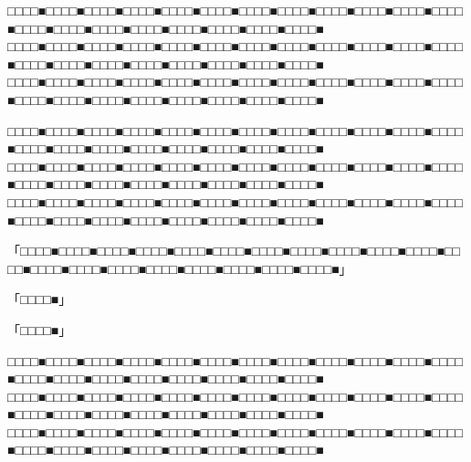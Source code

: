 \documentclass[
tate,
book,
openany,
paper={202mm,270mm},
oneside,
fontsize=9pt, %
jafontsize=9pt, %
head_space=11truemm, %
gutter=8truemm, %
line_length=78zw, %
number_of_lines=35, %
column_gap=5truemm,%
headfoot_verticalposition=4truemm,%
draft
]{jlreq}
\begin{document}
\begin{multicols*}{3}
□□□□■□□□□■□□□□■□□□□■□□□□■□□□□■□□□□■□□□□■□□□□■□□□□■□□□□■□□□□■□□□□■□□□□■□□□□■□□□□■□□□□■□□□□■□□□□■□□□□■
□□□□■□□□□■□□□□■□□□□■□□□□■□□□□■□□□□■□□□□■□□□□■□□□□■□□□□■□□□□■□□□□■□□□□■□□□□■□□□□■□□□□■□□□□■□□□□■□□□□■
□□□□■□□□□■□□□□■□□□□■□□□□■□□□□■□□□□■□□□□■□□□□■□□□□■□□□□■□□□□■□□□□■□□□□■□□□□■□□□□■□□□□■□□□□■□□□□■□□□□■

□□□□■□□□□■□□□□■□□□□■□□□□■□□□□■□□□□■□□□□■□□□□■□□□□■□□□□■□□□□■□□□□■□□□□■□□□□■□□□□■□□□□■□□□□■□□□□■□□□□■
□□□□■□□□□■□□□□■□□□□■□□□□■□□□□■□□□□■□□□□■□□□□■□□□□■□□□□■□□□□■□□□□■□□□□■□□□□■□□□□■□□□□■□□□□■□□□□■□□□□■
□□□□■□□□□■□□□□■□□□□■□□□□■□□□□■□□□□■□□□□■□□□□■□□□□■□□□□■□□□□■□□□□■□□□□■□□□□■□□□□■□□□□■□□□□■□□□□■□□□□■

「□□□□■□□□□■□□□□■□□□□■□□□□■□□□□■□□□□■□□□□■□□□□■□□□□■□□□□■□□□□■□□□□■□□□□■□□□□■□□□□■□□□□■□□□□■□□□□■□□□□■」

「□□□□■」

「□□□□■」

□□□□■□□□□■□□□□■□□□□■□□□□■□□□□■□□□□■□□□□■□□□□■□□□□■□□□□■□□□□■□□□□■□□□□■□□□□■□□□□■□□□□■□□□□■□□□□■□□□□■
□□□□■□□□□■□□□□■□□□□■□□□□■□□□□■□□□□■□□□□■□□□□■□□□□■□□□□■□□□□■□□□□■□□□□■□□□□■□□□□■□□□□■□□□□■□□□□■□□□□■
□□□□■□□□□■□□□□■□□□□■□□□□■□□□□■□□□□■□□□□■□□□□■□□□□■□□□□■□□□□■□□□□■□□□□■□□□□■□□□□■□□□□■□□□□■□□□□■□□□□■

\end{multicols*}
\end{document}
